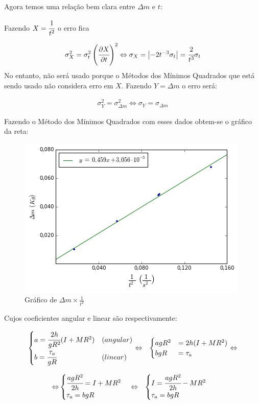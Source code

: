 \documentclass[a4paper]{article}
\begin{document}
Agora temos uma relação bem clara entre $\Delta m$ e $t$:

Fazendo $X=\cfrac{1}{t^{2}}$ o erro fica

$$\sigma_{X}^{2}=\sigma_{t}^{2}\left(\cfrac{\partial X}{\partial t}\right)^{2}\Leftrightarrow\sigma_{X}=\left|-2t^{-3}\sigma_{t}\right|=\cfrac{2}{t^{3}}\sigma_{t}$$
No entanto, não será usado porque o Métodos dos Mínimos Quadrados que está sendo usado não considera erro em $X$.
Fazendo $Y=\Delta m$ o erro será:

\begin{align}
\sigma_{Y}^{2}=\sigma_{\Delta m}^{2}\Leftrightarrow\sigma_{Y}=\sigma_{\Delta m}
\end{align}

Fazendo o Método dos Mínimos Quadrados com esses dados obtem-se o gráfico da reta:

\begin{figure}[!ht]
	\centering
		\includegraphics[scale=0.747]{grafico-lab04.png}
		\caption{Gráfico de $\Delta m\times\frac{1}{t^{2}}$}
\end{figure}

Cujos coeficientes angular e linear são respectivamente:

\begin{eqnarray*}
\begin{cases}
a=\cfrac{2h}{gR^{2}}(I+MR^{2}) & (angular)\\
b=\cfrac{\tau_{a}}{gR} & (linear)
\end{cases} & \Leftrightarrow & \begin{cases}
agR^{2} & =2h(I+MR^{2})\\
bgR & =\tau_{a}
\end{cases}\Leftrightarrow
\end{eqnarray*}


\begin{eqnarray*}
\Leftrightarrow & \begin{cases}
\cfrac[r]{agR^{2}}{2h}=I+MR^{2}\\
\tau_{a}=bgR
\end{cases}\Leftrightarrow & \begin{cases}
I=\cfrac[r]{agR^{2}}{2h}-MR^{2}\\
\tau_{a}=bgR
\end{cases}
\end{eqnarray*}
\end{document}
